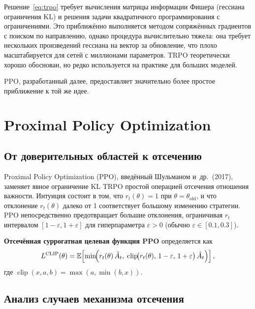 Решение~\eqref{eq:trpo} требует вычисления матрицы информации Фишера (гессиана ограничения KL) и решения задачи квадратичного программирования с ограничениями. Это приближённо выполняется методом сопряжённых градиентов с поиском по направлению, однако процедура вычислительно тяжела: она требует нескольких произведений гессиана на вектор за обновление, что плохо масштабируется для сетей с миллионами параметров. TRPO теоретически хорошо обоснован, но редко используется на практике для больших моделей.

PPO, разработанный далее, предоставляет значительно более простое приближение к той же идее.

\section{Proximal Policy Optimization}
\label{sec:ppo}

\subsection{От доверительных областей к отсечению}

Proximal Policy Optimization (PPO), введённый Шульманом и~др.~(2017), заменяет явное ограничение KL TRPO простой операцией отсечения отношения важности. Интуиция состоит в том, что $r_t(\theta) = 1$ при $\theta = \theta_\mathrm{old}$, и что отклонение $r_t(\theta)$ далеко от 1 соответствует большому изменению стратегии. PPO непосредственно предотвращает большие отклонения, ограничивая $r_t$ интервалом $[1-\varepsilon, 1+\varepsilon]$ для гиперпараметра $\varepsilon > 0$ (обычно $\varepsilon \in [0.1, 0.3]$).

\begin{definition}
\label{def:ppo-clip}
\textbf{Отсечённая суррогатная целевая функция PPO} определяется как
\begin{equation}
\label{eq:ppo-clip}
L^{\mathrm{CLIP}}(\theta)
= \operatorname{\mathbb{E}}\!\left[\min\!\Bigl(
    r_t(\theta)\,\hat{A}_t,\;
    \operatorname{clip}\!\bigl(r_t(\theta),\,1-\varepsilon,\,1+\varepsilon\bigr)
    \,\hat{A}_t
  \Bigr)\right],
\end{equation}
где $\operatorname{clip}(x, a, b) = \max(a, \min(b, x))$.
\end{definition}

\subsection{Анализ случаев механизма отсечения}

